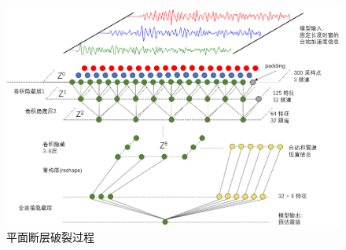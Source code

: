 \begin{figure}[!h]
  \centerin
  \includegraphics[width=0.99\linewidth]{img/CNN.png}
    \caption{ 平面断层破裂过程} \label{fig:rupture-process}
 \end{figure} 


